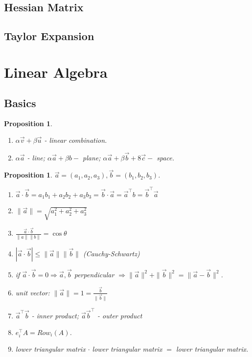 \documentclass[13pt]{article}
\newtheorem{proposition}[theorem]{Proposition}
\theoremstyle{definition}
\theoremstyle{remark}
\begin{document}
\subsection{Hessian Matrix}

\subsection{Taylor Expansion}


\newpage
\section{Linear Algebra}
\begin{multicols}{2}

\section{Basics}
\begin{proposition}
\begin{enumerate}
    \item $\alpha \vec{v}+\beta \vec{u}$ - linear combination.
    \item $\alpha \vec{a}$ - line; \quad  $\alpha \vec{a}+\beta b-$ plane; \quad $\alpha \vec{a}+\beta \vec{b}+8 \vec{c}-$ space.
\end{enumerate}
\end{proposition}


\begin{proposition}$\vec{a}=\left(a_1, a_2, a_3\right), \vec{b}=\left(b_1, b_2, b_3\right)$.
\begin{enumerate}
    \item $\vec{a} \cdot \vec{b}=a_1 b_1+a_2 b_2+a_3 b_3=\vec{b} \cdot \vec{a}=\vec{a}^{\top} b=\vec{b}^{\top} \vec{a}$
    \item $\|\vec{a}\|=\sqrt{a_1^2+a_2^2+a_3^2}$
    \item $\frac{\vec{a} \cdot \vec{b}}{\|a\|\|b\|}=\cos \theta$
    \item $|\vec{a} \cdot \vec{b}| \leq\|\vec{a}\|\|\vec{b}\|$ (Cauchy-Schwartz)
    \item if $\vec{a} \cdot \vec{b}=0 \Rightarrow \vec{a}, \vec{b}$ perpendicular $\Rightarrow\|\vec{a}\|^2+\|\vec{b}\|^2=\|\vec{a}-\vec{b}\|^2$.
    \item  unit vector: $\|\vec{a}\|=1=\frac{\vec{b}}{\|\vec{b}\|}$
    \item $\vec{a}^\top \vec{b}$ - inner product; $\vec{a} \vec{b}^\top$ - outer product
    \item $e_i^\top A = Row_i(A)$.
    \item lower triangular matrix $\cdot$ lower triangular matrix $=$ lower triangular matrix.
\end{enumerate}
\end{proposition}


\end{multicols}
\end{document}
